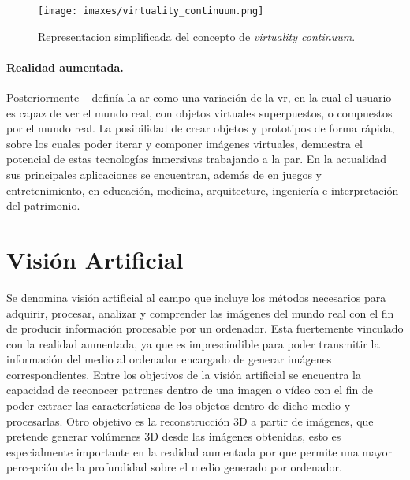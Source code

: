 \begin{figure}
	\centering
	\texttt{[image: imaxes/virtuality\_continuum.png]}
	\caption{Representacion simplificada del concepto de \emph{virtuality continuum}.}
	\label{fig:vc}
\end{figure}

\paragraph{Realidad aumentada.}
Posteriormente \citeauthor{Azuma1997}~\cite{Azuma1997} definía la \acrlong{ar} como una variación de la \acrlong{vr}, en la cual el usuario es capaz de ver el mundo real, con objetos virtuales superpuestos, o compuestos por el mundo real. La posibilidad de crear objetos y prototipos de forma rápida, sobre los cuales poder iterar y componer imágenes virtuales, demuestra el potencial de estas tecnologías inmersivas trabajando a la par. En la actualidad sus principales aplicaciones se encuentran, además de en juegos y entretenimiento, en educación, medicina, arquitecture, ingeniería e interpretación del patrimonio.


\section{Visión Artificial}

Se denomina visión artificial al campo que incluye los métodos necesarios para adquirir, procesar, analizar y comprender las imágenes del mundo real con el fin de producir información procesable por un ordenador. Esta fuertemente vinculado con la realidad aumentada, ya que es imprescindible para poder transmitir la información del medio al ordenador encargado de generar imágenes correspondientes.
Entre los objetivos de la visión artificial se encuentra la capacidad de reconocer patrones dentro de una imagen o vídeo con el fin de poder extraer las características de los objetos dentro de dicho medio y  procesarlas.
Otro objetivo es la reconstrucción 3D a partir de imágenes, que pretende generar volúmenes 3D desde las imágenes obtenidas, esto es especialmente importante en la realidad aumentada por que permite una mayor percepción de la profundidad sobre el medio generado por ordenador.